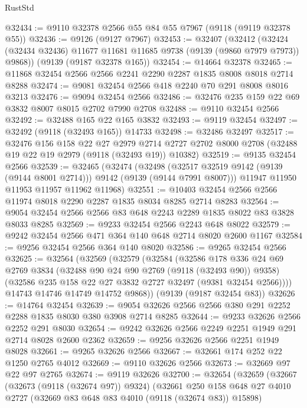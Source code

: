 \begin{lexlean}{RustStd}
\begin{coremodule}
@32434 := @9110 @32378 @2566 @55 @84 @55 @7967 (@9118 (@9119 @32378 @55))
@32436 := @9126 (@9127 @7967)
@32453 := @32407
    (@32412 (@32424 (@32434 @32436) @11677 @11681 @11685 @9738 (@9139 (@9860 @7979 @7973)) @9868))
    (@9139 (@9187 @32378 @165))
@32454 := @14664 @32378
@32465 := @11868 @32454 @2566 @2566 @2241 @2290 @2287 @1835 @8008 @8018 @2714 @8288
@32474 := @9081 @32454 @2566 @418 @2240 @70 @291 @8008 @8016 @3213
@32476 := @9094 @32454 @2566
@32486 := @32476 @235 @159 @22 @69 @3832 @8007 @8015 @2702 @7990 @2708
@32488 := @9110 @32454 @2566
@32492 := @32488 @165 @22 @165 @3832
@32493 := @9119 @32454
@32497 := @32492 (@9118 (@32493 @165)) @14733
@32498 := @32486 @32497
@32517 := @32476
    @156
    @158
    @22
    @27
    @2979
    @2714
    @2727
    @2702
    @8000
    @2708
    (@32488 @19 @22 @19 @2979 (@9118 (@32493 @19)) @10382)
@32519 := @9135 @32454 @2566
@32539 := @32465
    (@32474
      (@32498 (@32517 @32519 @9142 (@9139 (@9144 @8001 @2714))) @9142 (@9139 (@9144 @7991 @8007)))
      @11947
      @11950
      @11953
      @11957
      @11962
      @11968)
@32551 := @10403 @32454 @2566 @2566 @11974 @8018 @2290 @2287 @1835 @8034 @8285 @2714 @8283
@32564 := @9054 @32454 @2566 @2566 @83 @648 @2243 @2289 @1835 @8022 @83 @3828 @8033 @8285
@32569 := @9233 @32454 @2566 @2243 @648 @8022
@32579 := @9242 @32454 @2566 @471 @364 @140 @648 @2714 @8020 @2600 @1167
@32584 := @9256 @32454 @2566 @364 @140 @8020
@32586 := @9265 @32454 @2566
@32625 := @32564
    (@32569
      (@32579
        (@32584
          (@32586
            @178
            @336
            @24
            @69
            @2769
            @3834
            (@32488 @90 @24 @90 @2769 (@9118 (@32493 @90)) @9358)
            (@32586 @235 @158 @22 @27 @3832 @2727 @32497 (@9381 @32454 @2566))))
        @14743
        @14746
        @14749
        @14752
        @9868))
    (@9139 (@9187 @32454 @83))
@32626 := @14764 @32454
@32639 := @9054 @32626 @2566 @2566 @380 @291 @2252 @2288 @1835 @8030 @380 @3908 @2714 @8285
@32644 := @9233 @32626 @2566 @2252 @291 @8030
@32654 := @9242 @32626 @2566 @2249 @2251 @1949 @291 @2714 @8028 @2600 @2362
@32659 := @9256 @32626 @2566 @2251 @1949 @8028
@32661 := @9265 @32626 @2566
@32667 := @32661 @174 @252 @22 @1250 @2765 @4012
@32669 := @9110 @32626 @2566
@32673 := @32669 @97 @22 @97 @2765
@32674 := @9119 @32626
@32700 := @32654
    (@32659
      (@32667
        (@32673 (@9118 (@32674 @97)) @9324)
        (@32661
          @250
          @158
          @648
          @27
          @4010
          @2727
          (@32669 @83 @648 @83 @4010 (@9118 (@32674 @83)) @15898)

\end{coremodule}
\end{lexlean}
